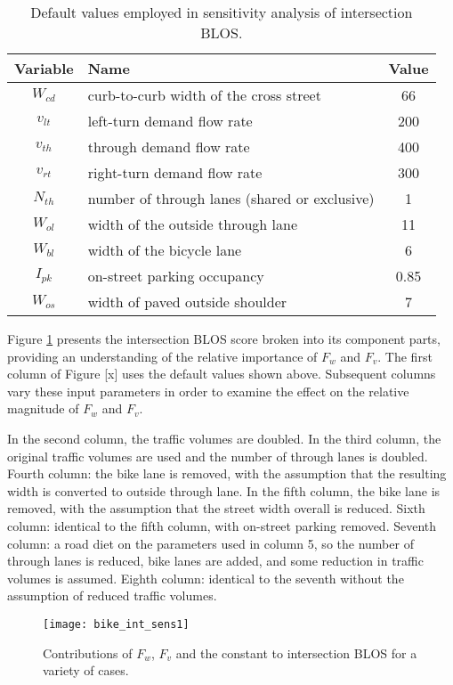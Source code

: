 \documentclass[11pt]{article} %
\begin{document}
\begin{table}
\centering
\begin{tabular}{|c|l|c|}
\toprule
Variable & Name  & Value \\
\midrule
$W_{cd}$ & curb-to-curb width of the cross street & 66 \\
$v_{lt}$ & left-turn demand flow rate & 200 \\
$v_{th}$ & through demand flow rate & 400 \\
$v_{rt}$ & right-turn demand flow rate & 300 \\
$N_{th}$ & number of through lanes (shared or exclusive) & 1 \\
$W_{ol}$ & width of the outside through lane & 11 \\
$W_{bl}$ & width of the bicycle lane & 6 \\
$I_{pk}$ & on-street parking occupancy & 0.85 \\
$W_{os}$ & width of paved outside shoulder & 7 \\
\bottomrule
\end{tabular}
\caption{Default values employed in sensitivity analysis of intersection BLOS.}
\label{table:BLOS_int_sens_default}
\end{table}

Figure \ref{fig:bike_int_sens1} presents the intersection BLOS score broken into its component parts, providing an understanding of the relative importance of $F_w$ and $F_v$. The first column of Figure [x] uses the default values shown above. Subsequent columns vary these input parameters in order to examine the effect on the relative magnitude of $F_w$ and $F_v$. 

In the second column, the traffic volumes are doubled. In the third column, the original traffic volumes are used and the number of through lanes is doubled. Fourth column: the bike lane is removed, with the assumption that the resulting width is converted to outside through lane. In the fifth column, the bike lane is removed, with the assumption that the street width overall is reduced. Sixth column: identical to the fifth column, with on-street parking removed. Seventh column: a road diet on the parameters used in column 5, so the number of through lanes is reduced, bike lanes are added, and some reduction in traffic volumes is assumed. Eighth column: identical to the seventh without the assumption of reduced traffic volumes.


\begin{figure}

\texttt{[image: bike\_int\_sens1]}

\caption{Contributions of $F_w$, $F_v$ and the constant to intersection BLOS for a variety of cases.}

\label{fig:bike_int_sens1}

\end{figure}
\end{document}
